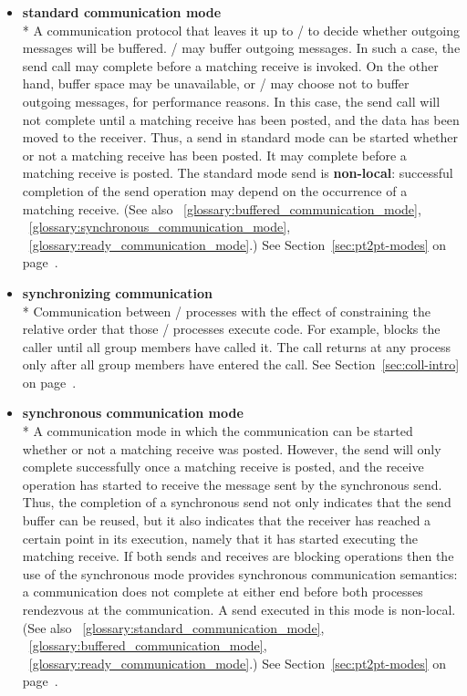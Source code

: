 \begin{itemize}
\label{glossary:standard_communication_mode}
\item \textbf{ standard communication mode} \\*
A communication protocol that leaves it up to \MPI/ to decide whether outgoing
messages will be buffered.  \MPI/ may
buffer outgoing messages.  In such a case, the send call may complete
before a matching receive is invoked.  On the other hand, buffer space may be
unavailable, or \MPI/ may choose not to buffer
outgoing messages, for performance reasons. In this case,
the send call will not complete until a matching receive has been posted, and
the data has been moved to the receiver.
Thus, a send in standard mode can be started whether or not a
matching receive has been posted.  It may complete before a matching receive
is posted.  The
standard mode send is {\bf non-local}:  successful completion of the send
operation may depend on the occurrence of a matching receive. 
(See also ~\ref{glossary:buffered_communication_mode}, 
~\ref{glossary:synchronous_communication_mode},
~\ref{glossary:ready_communication_mode}.)
See Section~\ref{sec:pt2pt-modes} on page~\pageref{sec:pt2pt-modes}.

\label{glossary:synchronizing_communication}
\item \textbf{ synchronizing communication} \\*
Communication between \MPI/ processes with the effect of constraining the relative 
order that those \MPI/  processes execute code. For example,  
blocks the caller until all group members have called it. The call returns at any process 
only after all group members have
entered the call.
See Section~\ref{sec:coll-intro} on page~\pageref{sec:coll-intro}.

\label{glossary:synchronous_communication_mode}
\item \textbf{ synchronous communication mode} \\*
A communication mode in which the
communication can be started whether or
not a matching receive was posted.  However, the send will only complete 
successfully once a matching receive is posted, and the
receive operation has started to receive the message sent by the
synchronous send.
Thus, the completion of a synchronous send not only indicates that the
send buffer can be reused, but 
it also indicates that the receiver has
reached a certain point in its execution, namely that it has started
executing the matching receive.  If both sends and receives are
blocking operations then the use of the synchronous mode provides
synchronous communication semantics: a communication does not complete
at either end before both processes rendezvous at the
communication.  A send executed in this mode is non-local.
(See also ~\ref{glossary:standard_communication_mode}, 
~\ref{glossary:buffered_communication_mode},
~\ref{glossary:ready_communication_mode}.)
See Section~\ref{sec:pt2pt-modes} on page~\pageref{sec:pt2pt-modes}.


\end{itemize}
